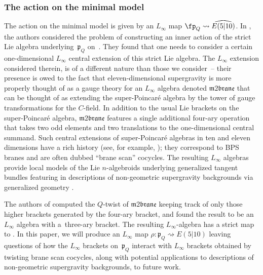 \documentclass[pdftex]{sigma}
\numberwithin{equation}{section}
\theoremstyle{definition}
\begin{document}
\subsubsection{The action on the minimal model}
The action on the minimal model is given by an $L_\infty$ map $\fp_Q \rightsquigarrow \smash{\widehat{E(5|10)}}$. In \cite{RSW}, the authors considered the problem of constructing an inner action of the strict Lie algebra underlying~$\mathfrak{p}_Q$ on~. They found that one needs to consider a certain one-dimensional $L_\infty$ central extension of this strict Lie algebra. The $L_\infty$ extension considered therein, is of a different nature than those we consider~-- their presence is owed to the fact that eleven-dimensional supergravity is more properly thought of as a gauge theory for an $L_\infty$ algebra denoted $\mathfrak{m2brane}$ that can be thought of as extending the super-Poincar\'e algebra by the tower of gauge transformations for the $C$-field. In addition to the usual Lie brackets on the super-Poincar\'e algebra, $\mathfrak{m2brane}$ features a single additional four-ary operation that takes two odd elements and two translations to the one-dimensional central summand. Such central extensions of super-Poincar\'e algebras in ten and eleven dimensions have a rich history (see, for example, \cite{FSS}); they correspond to BPS branes and are often dubbed ``brane scan'' cocycles. The resulting $L_\infty$ algebras provide local models of the Lie $n$-algebroids underlying generalized tangent bundles featuring in descriptions of non-geometric supergravity backgrounds via generalized geometry \cite{Cederwall_2019, malgebra,Hull_2007, smithwaldram}.

The authors of \cite{RSW} computed the $Q$-twist of $\mathfrak{m2brane}$ keeping track of only those higher brackets generated by the four-ary bracket, and found the result to be an $L_\infty$ algebra with a~three-ary bracket. The resulting $L_\infty$-algebra has a strict map to . In this paper, we will produce an $L_\infty$ map
$\rho\colon\mathfrak{p}_Q \rightsquigarrow E(5|10)$
leaving questions of how the $L_\infty$ brackets on~$\mathfrak{p}_Q$ interact with $L_\infty$ brackets obtained by twisting brane scan cocycles, along with potential applications to descriptions of non-geometric supergravity backgrounds, to future work.
\end{document}
